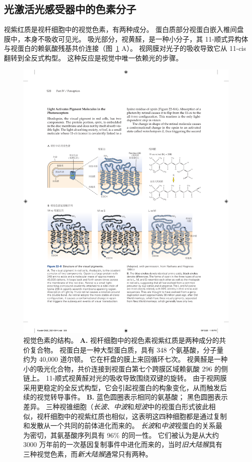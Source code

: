 \subsection{光激活光感受器中的色素分子}

视紫红质是视杆细胞中的视觉色素，有两种成分。
蛋白质部分视蛋白嵌入椎间盘膜中，本身不吸收可见光。 
吸光部分，视黄醛，是一种小分子，其 11-顺式异构体与视蛋白的赖氨酸残基共价连接（图~\ref{fig:22_8} A）。
视网膜对光子的吸收导致它从 11-cis 翻转到全反式构型。
这种反应是视觉中唯一依赖光的步骤。


\begin{figure}[htbp]
	\centering
	\includegraphics[width=1.0\linewidth]{chap22/fig_22_8}
	\caption{视觉色素的结构。 
		\textbf{A.} 视杆细胞中的视色素视紫红质是两种成分的共价复合物。 
		视蛋白是一种大型蛋白质，具有 348 个氨基酸，分子量约为 40,000 道尔顿。 
		它在杆盘的膜上来回循环七次。 
		视黄醛是一种小的吸光化合物，共价连接到视蛋白第七个跨膜区域赖氨酸 296 的侧链上。 
		11-顺式视黄醛对光的吸收导致围绕双键的旋转。 
		由于视网膜采用更稳定的全反式构型，它会引起视蛋白的构象变化，从而触发后续的视觉转导事件\cite{nathans1984isolation}。
		\textbf{B.} 蓝色圆圈表示相同的氨基酸； 黑色圆圈表示差异。
		三种视锥细胞（\textit{长波}、\textit{中波}和\textit{短波}中的视蛋白形式彼此相似，视杆细胞中的视紫红质也相似，这表明这四种细胞都是通过复制和发散从一个共同的前体进化而来的。
		\textit{长波}和\textit{中波}视蛋白的关系最为密切，其氨基酸序列具有 96\% 的同一性。 
		它们被认为是从大约 3000 万年前的一次基因复制事件中进化而来的，当时\textit{旧大陆猴}具有三种视觉色素，而\textit{新大陆猴}通常只有两种。}
	\label{fig:22_8}
\end{figure}


